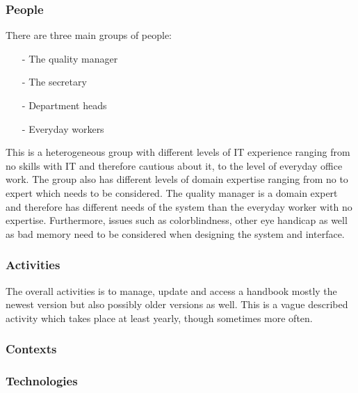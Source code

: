 \subsubsection*{People}

There are three main groups of people:
\begin{itemize}
	\item [-] The quality manager
	\item [-] The secretary
	\item [-] Department heads
	\item [-] Everyday workers
\end{itemize}
This is a heterogeneous group with different levels of IT experience ranging from no skills with IT and therefore cautious about it, to the level of everyday office work.
The group also has different levels of domain expertise ranging from no to expert which needs to be considered. The quality manager is a domain expert and therefore has different needs of the system than the everyday worker with no expertise.
\newline
Furthermore, issues such as colorblindness, other eye handicap as well as bad memory need to be considered when designing the system and interface.


\subsubsection*{Activities}
The overall activities is to manage, update and access a handbook mostly the newest version but also possibly older versions as well.
This is a vague described activity which takes place at least yearly, though sometimes more often.


\subsubsection*{Contexts}

\subsubsection*{Technologies}














